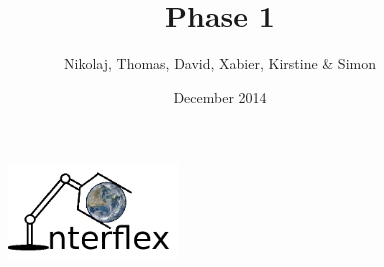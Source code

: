 \begin{titlepage}


\title{Phase 1}
\author{Nikolaj, Thomas, David, Xabier, Kirstine \& Simon }
\date{December 2014}

\begin{figure}[b]
\centering
\includegraphics[width=0.4\textwidth]{graphics/logo}
\end{figure}

\vfill
\end{titlepage}
\maketitle

